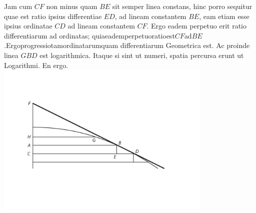 Jam cum $CF$ non minus quam $BE$ sit semper linea constans, hinc porro sequitur quae est ratio ipsius differentiae $ED$, ad lineam constantem $BE$, eam etiam esse ipsius ordinatae $CD$ ad lineam constantem $CF$. Ergo eadem perpetuo erit ratio differentiarum ad ordinatas; quia\hfill eadem\hfill perpetuo\hfill ratio\hfill est\hfill $CF$\hfill ad\hfill $BE$.\hfill Ergo\hfill progressio\hfill tam\hfill ordinatarum\hfill quam differentiarum Geometrica est. Ac proinde linea $GBD$ est logarithmica. Itaque si  sint ut numeri, spatia percursa\protect{} erunt ut Logarithmi. En ergo.
\pend
\vspace{1em}
\pstart
\noindent
\centering
     \includegraphics[trim = 0mm -3mm 0mm 0mm, clip, width=0.78\textwidth]{images/lh03705_012v_1-d1.pdf}\\ 
    \noindent {}%
\pend
\count{}
\count{}
\count{}
\newpage
